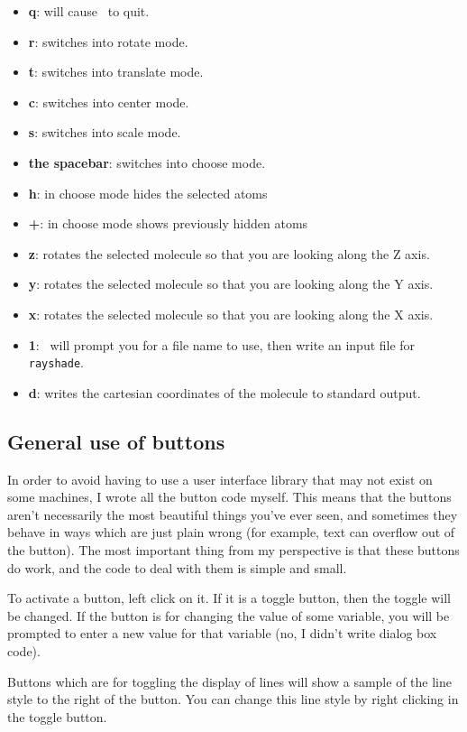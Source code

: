 \begin{itemize}
\item {\bf q}: will cause \viewprog\ to quit.
\item {\bf r}: switches into rotate mode.
\item {\bf t}: switches into translate mode.
\item {\bf c}: switches into center mode.
\item {\bf s}: switches into scale mode.
\item {\bf the spacebar}: switches into choose mode.
\item {\bf h}: in choose mode hides the selected atoms
\item {\bf +}: in choose mode shows previously hidden atoms
\item {\bf z}: rotates the selected molecule so that you are looking
along the Z axis.
\item {\bf y}: rotates the selected molecule so that you are looking
along the Y axis.
\item {\bf x}: rotates the selected molecule so that you are looking
along the X axis.
\item {\bf 1}: \viewprog\ will prompt you for a file name to use, then
write an input file for {\tt rayshade}.
\item {\bf d}: writes the cartesian coordinates of the molecule to
standard output.
\end{itemize}


\subsection{General use of buttons}

In order to avoid having to use a user interface library that may not
exist on some machines, I wrote all the button code myself.  This
means that the buttons aren't necessarily the most beautiful things
you've ever seen, and sometimes they behave in ways which are just
plain wrong (for example, text can overflow out of the button).  The
most important thing from my perspective is that these buttons do
work, and the code to deal with them is simple and small.

To activate a button, left click on it.  If it is a toggle button,
then the toggle will be changed.  If the button is for changing the
value of some variable, you will be prompted to enter a new value for
that variable (no, I didn't write dialog box code).  

Buttons which are for toggling the display of lines will show a sample
of the line style to the right of the button.  You can change this
line style by right clicking in the toggle button.

